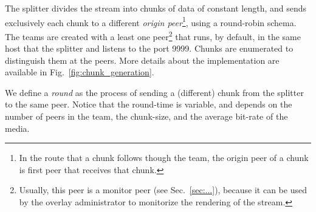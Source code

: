 \label{sec:feeding_the_team}

The splitter divides the stream into chunks of data of constant
length, and sends exclusively each chunk to a different \emph{origin
  peer}\footnote{In the route that a chunk follows though the team,
  the origin peer of a chunk is first peer that receives that chunk.},
using a round-robin schema. The teams are created with a least one
peer\footnote{Usually, this peer is a monitor peer (see
  Sec.~\ref{sec:...}), because it can be used by the overlay
  administrator to monitorize the rendering of the stream.} that runs,
by default, in the same host that the splitter and listens to the port
9999. Chunks are enumerated to distinguish them at the peers. More
details about the implementation are available in
Fig.~\ref{fig:chunk_generation}.


\begin{figure*}
   \caption{Chunk
    generation at the splitter and their transmission to the
    team.\label{fig:chunk_generation}}
\end{figure*}

We define a \emph{round} as the process of sending a (different) chunk
from the splitter to the same peer. Notice that the round-time is
variable, and depends on the number of peers in the team, the
chunk-size, and the average bit-rate of the media.

\begin{comment}
(in a team) as the time necessary to send two
consecutive chunks from the splitter (of such team) to the same peer,
using the round-robing. This time is variable and depends on $|T|$,
$C$, and the average bit-rate of the media, $A$.
\end{comment}

\begin{comment}
The round-time is defined by:
\begin{equation}
  \cal{r} = \cal{c}N.
  \label{eq:round_time}
\end{equation}
For example, if we use only one team of $N=256$ peers, a chunk size
$C=1024$~bytes, and a video of $1$~Mb/s, the round time is
\begin{displaymath}
  \cal{r} = \frac{1024\frac{\text{bytes}}{\text{chunk}}\times
    8\frac{\text{bits}}{\text{byte}}}{10^6\frac{\text{bits}}{\text{second}}}\times
  256 \approx 2.1~\text{seconds}.
\end{displaymath}
\end{comment}
